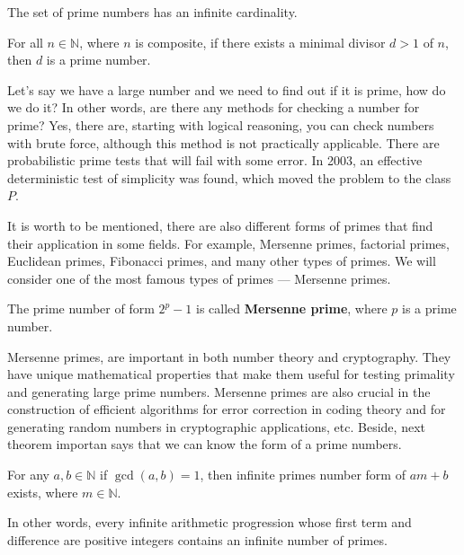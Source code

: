 \documentclass[../lecture-notes-148x210.tex]{subfiles}
\begin{document}
\begin{corollary}
    The set of prime numbers has an infinite cardinality.
\end{corollary}

\begin{lemma}
    For all $n \in \mathbb{N}$, where $n$ is composite, if there exists a 
    minimal divisor $d>1$ of $n$, then $d$ is a prime number.
\end{lemma}

Let's say we have a large number and we need to find out if it is prime, how do we do it?
In other words, are there any methods for checking a number for prime?
Yes, there are, starting with logical reasoning, you can check numbers with brute force, although
this method is not practically applicable. There are probabilistic prime tests that will fail
with some error. In 2003, an effective deterministic test of simplicity was found, which moved
the problem to the class $P$.

It is worth to be mentioned, there are also different forms of primes that find their application in some fields. 
For example, Mersenne primes, factorial primes, Euclidean primes, Fibonacci primes, and many other types of primes.
We will consider one of the most famous types of primes --- Mersenne primes.

\begin{definition} 
    The prime number of form $2^p - 1$ is called \textbf{Mersenne prime}, where $p$ is a
    prime number.
\end{definition}

Mersenne primes, are important in both number theory and cryptography.
They have unique mathematical properties that make them useful for testing primality and generating large prime numbers.
Mersenne primes are also crucial in the construction of efficient algorithms for error correction in coding theory and for generating random numbers in cryptographic applications, etc. 
Beside, next theorem importan says that we can know the form of a prime numbers.

\begin{theorem} 
    For any $a, b \in \mathbb{N}$ if $\gcd(a, b) = 1$, then infinite primes number form of $am + b$ exists, where $m \in \mathbb{N}$.
\end{theorem}

In other words, every infinite arithmetic progression whose first term and difference are positive integers contains an infinite number of primes.
\end{document}
